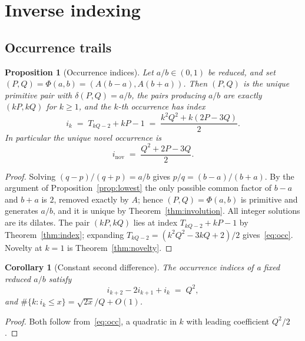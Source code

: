 \documentclass[11pt,a4paper]{article}
\theoremstyle{plain}
\newtheorem{proposition}[theorem]{Proposition}
\newtheorem{corollary}[theorem]{Corollary}
\theoremstyle{definition}
\theoremstyle{remark}
\begin{document}
\section{Inverse indexing}
\label{sec:inverse}

\subsection{Occurrence trails}

\begin{proposition}[Occurrence indices]\label{prop:occ}
Let $a/b \in (0,1)$ be reduced, and set $(P,Q) = \Phi(a,b) = (A(b-a), A(b+a))$.
Then $(P,Q)$ is the unique primitive pair with $\delta(P,Q) = a/b$, the pairs
producing $a/b$ are exactly $(kP, kQ)$ for $k \ge 1$, and the $k$-th occurrence
has index
\begin{equation}\label{eq:occ}
  i_k \;=\; T_{kQ-2} + kP - 1 \;=\; \frac{k^2 Q^2 + k(2P - 3Q)}{2}.
\end{equation}
In particular the unique novel occurrence is
\begin{equation}\label{eq:novidx}
  i_{\mathrm{nov}} \;=\; \frac{Q^2 + 2P - 3Q}{2}.
\end{equation}
\end{proposition}

\begin{proof}
Solving $(q-p)/(q+p) = a/b$ gives $p/q = (b-a)/(b+a)$. By the argument of
Proposition~\ref{prop:lowest} the only possible common factor of $b-a$ and
$b+a$ is $2$, removed exactly by $A$; hence $(P,Q) = \Phi(a,b)$ is primitive and
generates $a/b$, and it is unique by Theorem~\ref{thm:involution}. All integer
solutions are its dilates. The pair $(kP,kQ)$ lies at index
$T_{kQ-2} + kP - 1$ by Theorem~\ref{thm:index}; expanding
$T_{kQ-2} = (k^2Q^2 - 3kQ + 2)/2$ gives~\eqref{eq:occ}. Novelty at $k=1$ is
Theorem~\ref{thm:novelty}.
\end{proof}

\begin{corollary}[Constant second difference]\label{cor:seconddiff}
The occurrence indices of a fixed reduced $a/b$ satisfy
\[
  i_{k+2} - 2 i_{k+1} + i_k \;=\; Q^2 ,
\]
and $\#\{k : i_k \le x\} = \sqrt{2x}/Q + O(1)$.
\end{corollary}

\begin{proof}
Both follow from~\eqref{eq:occ}, a quadratic in $k$ with leading coefficient
$Q^2/2$.
\end{proof}
\end{document}
